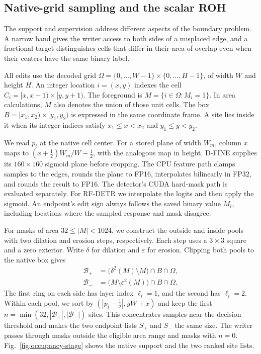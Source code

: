 \documentclass[journal]{IEEEtran}
\begin{document}
\subsection{Native-grid sampling and the scalar ROH}
\label{sec:occupancy}

The support and supervision address different aspects of the boundary problem. A narrow band gives the writer access to both sides of a misplaced edge, and a fractional target distinguishes cells that differ in their area of overlap even when their centers have the same binary label.

All edits use the decoded grid \(\Omega=\{0,\ldots,W-1\}\times\{0,\ldots,H-1\}\), of width \(W\) and height \(H\). An integer location \(i=(x,y)\) indexes the cell \(C_i=[x,x+1)\times[y,y+1)\). The foreground is \(M=\{i\in\Omega:M_i=1\}\). In area calculations, \(M\) also denotes the union of those unit cells. The box \(B=[x_1,x_2)\times[y_1,y_2)\) is expressed in the same coordinate frame. A site lies inside it when its integer indices satisfy \(x_1\le x<x_2\) and \(y_1\le y<y_2\).

We read \(p_i\) at the native cell center. For a stored plane of width \(W_m\), column \(x\) maps to \((x+\tfrac12)W_m/W-\tfrac12\), with the analogous map in height. D-FINE supplies its \(160\times160\) sigmoid plane before cropping. The CPU feature path clamps samples to the edges, rounds the plane to FP16, interpolates bilinearly in FP32, and rounds the result to FP16. The detector's CUDA hard-mask path is evaluated separately. For RF-DETR we interpolate the logits and then apply the sigmoid. An endpoint's edit sign always follows the saved binary value \(M_i\), including locations where the sampled response and mask disagree.

For masks of area \(32\le |M|<1024\), we construct the outside and inside pools with two dilation and erosion steps, respectively. Each step uses a \(3\times3\) square and a zero exterior. Write \(\delta\) for dilation and \(\varepsilon\) for erosion. Clipping both pools to the native box gives
\begin{equation}
\begin{aligned}
 \mathcal B_+ &= \bigl(\delta^2(M)\setminus M\bigr)\cap B\cap\Omega,\\
 \mathcal B_- &= \bigl(M\setminus\varepsilon^2(M)\bigr)\cap B\cap\Omega .
\end{aligned}
\label{eq:native-bands}
\end{equation}
The first ring on each side has layer index \(\ell_i=1\), and the second has \(\ell_i=2\). Within each pool, we sort by \((|p_i-\tfrac12|,yW+x)\) and keep the first \(n=\min(32,|\mathcal B_+|,|\mathcal B_-|)\) sites. This concentrates samples near the decision threshold and makes the two endpoint lists \(S_+\) and \(S_-\) the same size. The writer passes through masks outside the eligible area range and masks with \(n=0\). Fig.~\ref{fig:occupancy-stage} shows the native support and the two ranked site lists.
\end{document}

